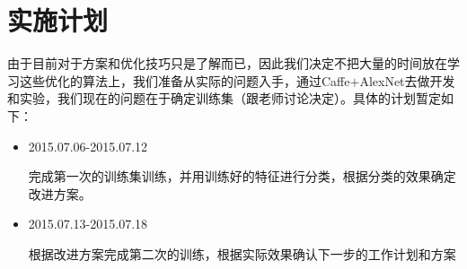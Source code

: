 \section{实施计划}

由于目前对于方案和优化技巧只是了解而已，因此我们决定不把大量的时间放在学习这些优化的算法上，我们准备从实际的问题入手，通过Caffe$+$AlexNet去做开发和实验，我们现在的问题在于确定训练集（跟老师讨论决定）。具体的计划暂定如下：

\begin{itemize}
\item 2015.07.06-2015.07.12
	
	完成第一次的训练集训练，并用训练好的特征进行分类，根据分类的效果确定改进方案。
\item 2015.07.13-2015.07.18

	根据改进方案完成第二次的训练，根据实际效果确认下一步的工作计划和方案
\end{itemize}







